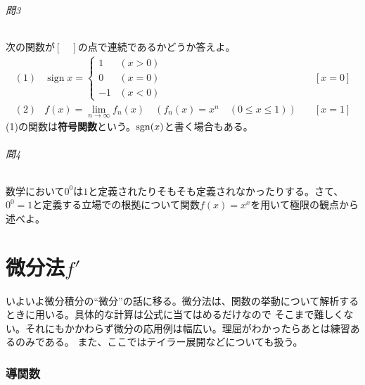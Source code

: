\documentclass[a4j,dvipdfmx]{jsarticle}
\newcommand{\sign}{\mathop{\mathrm{sign}}\nolimits}
\newcommand{\linktoMOKUZI}{\vspace{\stretch{1}}\fbox{\centerline{\hyperref[目次]{目次に戻る}}}}
\begin{document}
                \paragraph{問3}
                    次の関数が$[\quad]$の点で連続であるかどうか答えよ。
                    \begin{align*}
                        (1)&\sign x = \left\{\begin{array}{cc}\displaystyle 1 & (x>0) \\ 0 & (x=0) \\ -1 & (x<0)\end{array}\right.&\quad [x=0]\\
                        (2)&f(x)=\lim_{n\to \infty}f_n(x)\quad (f_n(x)=x^n\quad(0\leq x\leq 1))&\quad [x=1]
                    \end{align*} 
                    (1)の関数は\textbf{符号関数}という。${\rm sgn}(x)$と書く場合もある。

                \paragraph{問4}
                    数学において$0^0$は$1$と定義されたりそもそも定義されなかったりする。さて、$0^0=1$と定義する立場での根拠について関数$f(x)=x^x$を用いて極限の観点から述べよ。
                
                \linktoMOKUZI
                
    \clearpage
    \part{微分法$f'$}
    \begin{screen}
        いよいよ微分積分の``微分''の話に移る。微分法は、関数の挙動について解析するときに用いる。具体的な計算は公式に当てはめるだけなので
        そこまで難しくない。それにもかかわらず微分の応用例は幅広い。理屈がわかったらあとは練習あるのみである。
        また、ここではテイラー展開などについても扱う。
    \end{screen}
    \clearpage
    \section{導関数}
\end{document}
